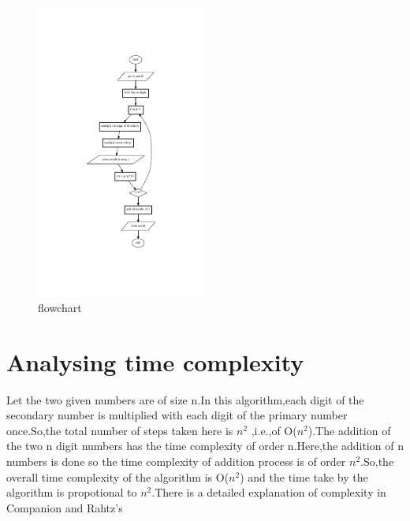 \documentclass[12pt]{article}
\begin{document}
\newline
\begin{figure}[h!]
  \caption{flowchart}
  \centering
    \includegraphics[width=0.5\textwidth]{flow}
\end{figure}
\section{Analysing time complexity}
Let the two given numbers are of size n.In this algorithm,each digit of the secondary number is multiplied with each digit of the primary number once.So,the total number of steps taken here is $n^2$ ,i.e.,of O($n^2$).The addition of the two n digit numbers has the time complexity of order n.Here,the addition of n numbers is done so the time complexity of addition process is of order $n^2$.So,the overall time complexity of the algorithm is O($n^2$) and the time take by the algorithm is propotional to $n^2$.There is a detailed explanation of complexity in Companion\cite{goossens93} and Rahtz's\cite{rahtz89}


\end{document}

